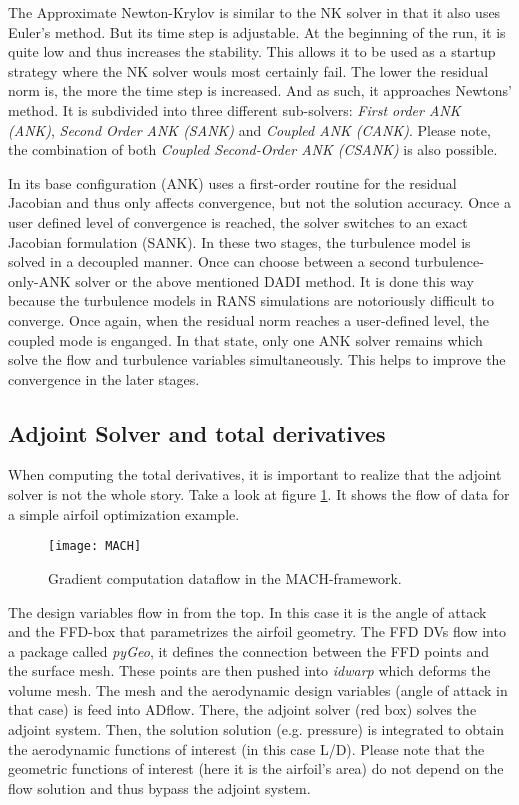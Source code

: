 The Approximate Newton-Krylov is similar to the NK solver in that it also uses
Euler's method. But its time step is adjustable. At the beginning of the run,
it is quite low and thus increases the stability. This allows it to be used
as a startup strategy where the NK solver wouls most certainly fail. The
lower the residual norm is, the more the time step is increased. And as such, it
approaches Newtons' method. It is subdivided into three different sub-solvers:
\textit{First order ANK (ANK)}, \textit{Second Order ANK (SANK)} and
\textit{Coupled ANK (CANK)}. Please note, the combination of both
\textit{Coupled Second-Order ANK (CSANK)} is also possible.

In its base configuration (ANK) uses a first-order routine for the residual
Jacobian and thus only affects convergence, but not the solution accuracy. Once
a user defined level of convergence is reached, the solver switches to an exact
Jacobian formulation (SANK). In these two stages, the turbulence model is
solved in a decoupled manner. Once can choose between a second
turbulence-only-ANK solver or the above mentioned DADI method. It is done this
way because the turbulence models in RANS simulations are notoriously difficult
to converge. Once again, when the residual norm reaches a user-defined level,
the coupled mode is enganged. In that state, only one ANK solver remains which
solve the flow and turbulence variables simultaneously. This helps to improve
the convergence in the later stages. \cite{adflow_solvers}




\subsection{Adjoint Solver and total derivatives}
When computing the total derivatives, it is important to realize that the
adjoint solver is not the whole story. Take a look at figure \ref{fig:MACH}. It
shows the flow of data for a simple airfoil optimization example.

\begin{figure}[H] \centering
    \texttt{[image: MACH]}
    \caption{Gradient computation dataflow in the MACH-framework. \cite{cm1}}
    \label{fig:MACH}
\end{figure}

\noindent The design variables flow in from the top. In this case it is the
angle of attack and the FFD-box that parametrizes the airfoil geometry. The FFD
DVs flow into a package called \textit{pyGeo}, it defines the connection
between the FFD points and the surface mesh. These points are then pushed into
\textit{idwarp} which deforms the volume mesh. The mesh and the aerodynamic
design variables (angle of attack in that case) is feed into ADflow. There, the
adjoint solver (red box) solves the adjoint system. Then, the solution solution
(e.g. pressure) is integrated to obtain the aerodynamic functions of interest
(in this case L/D). Please note that the geometric functions of interest (here
it is the airfoil's area) do not depend on the flow solution and thus bypass
the adjoint system. 

